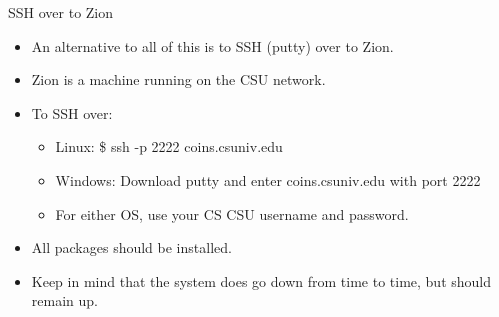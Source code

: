 \documentclass{beamer}
\begin{document}
\begin{frame}{SSH over to Zion}
\begin{itemize}
\item An alternative to all of this is to SSH (putty) over to Zion.
\item Zion is a machine running on the CSU network.
\item To SSH over:
\begin{itemize}
\item Linux: \$ ssh -p 2222 coins.csuniv.edu
\item Windows: Download putty and enter coins.csuniv.edu with port 2222
\item For either OS, use your CS CSU username and password.
\end{itemize}
\item All packages should be installed.
\item Keep in mind that the system does go down from time to time, but should remain up.
\end{itemize}
\end{frame}
\end{document}
